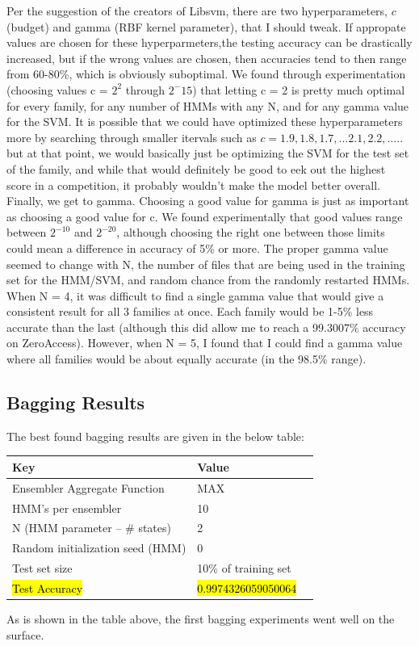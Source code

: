 \documentclass[12pt]{article}
\begin{document}
  Per the suggestion of the creators of Libsvm, there are two hyperparameters, $c$ (budget) and gamma (RBF kernel parameter), that I should tweak. If appropate values are chosen for these hyperparmeters,the testing accuracy can be drastically increased, but if the wrong values are chosen, then accuracies tend to then range from 60-80\%, which is obviously suboptimal.  We found through experimentation (choosing values c = $2^2$ through $2^-15$) that letting c = 2 is pretty much optimal for every family, for any number of HMMs with any N, and for any gamma value for the SVM. It is possible that we could have optimized these hyperparameters more by searching through smaller itervals such as $c = 1.9, 1.8, 1.7, ... 2.1, 2.2, .....$ but at that point, we would basically just be optimizing the SVM for the test set of the family, and while that would definitely be good to eek out the highest score in a competition, it probably wouldn't make the model better overall. Finally, we get to gamma. Choosing a good value for gamma is just as important as choosing a good value for c. We found experimentally that good values range between $2^{-10}$ and $2^{-20}$, although choosing the right one between those limits could mean a difference in accuracy of 5\% or more.
The proper gamma value seemed to change with N, the number of files that are being used in the training set for the HMM/SVM, and random chance from the randomly restarted HMMs. When N = 4, it was difficult to find a single gamma value that would give a consistent result for all 3 families at once. Each family would be 1-5\% less accurate than the last (although this did allow me to reach a 99.3007\% accuracy on ZeroAccess). However, when N = 5, I found that I could find a gamma value where all families would be about equally accurate (in the 98.5\% range). 

\subsection{Bagging Results}
  The best found bagging results are given in the below table:
  \begin{table}[H]
    \centering
  \begin{tabular}{|l|l|l|}
    \hline \textbf{Key} & \textbf{Value} \\\hline \hline
    Ensembler Aggregate Function & \textsc{MAX}  \\ \hline
    HMM's per ensembler & 10 \\ \hline
    N (HMM parameter -- \# states) & 2 \\ \hline
    Random initialization seed (HMM) & 0 \\ \hline
    Test set size  & 10\% of training set \\ \hline
  \hl{Test Accuracy} & \hl{0.9974326059050064}  \\ \hline
  \end{tabular}
  \end{table}  
  As is shown in the table above, the first bagging experiments went well on the surface. 
\end{document}
